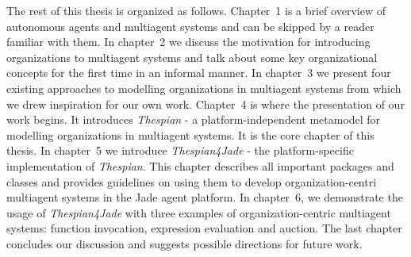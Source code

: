 
The rest of this thesis is organized as follows.
Chapter~1 is a brief overview of autonomous agents and multiagent systems and can be skipped by a reader familiar with them.
In chapter~2 we discuss the motivation for introducing organizations to multiagent systems and talk about some key organizational concepts for the first time in an informal manner.
In chapter~3 we present four existing approaches to modelling organizations in multiagent systems from which we drew inspiration for our own work.
Chapter~4 is where the presentation of our work begins. It introduces \textit{Thespian} - a platform-independent metamodel for modelling organizations in multiagent systems. It is the core chapter of this thesis.
In chapter~5 we introduce \textit{Thespian4Jade} - the platform-specific implementation of \textit{Thespian}. This chapter describes all important packages and classes and provides guidelines on using them to develop organization-centri multiagent systems in the Jade agent platform.
In chapter~6, we demonstrate the usage of \textit{Thespian4Jade} with three examples of organization-centric multiagent systems: function invocation, expression evaluation and auction.
The last chapter concludes our discussion and suggests possible directions for future work.